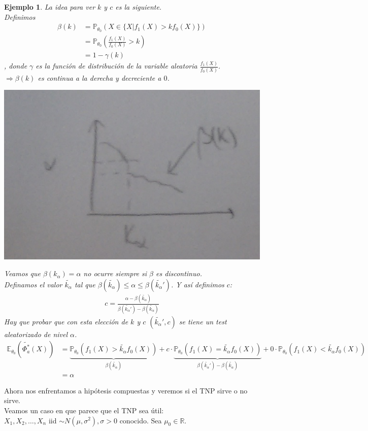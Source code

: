 \documentclass[10pt]{article}
\theoremstyle{plain}
\newtheorem{ej}{Ejemplo}
\theoremstyle{definition}
\begin{document}
\begin{ej}
La idea para ver $k$ y $c$ es la siguiente.\\
Definimos
\begin{align*}
\beta (k) &= \mathbb{P}_{\theta_{0}}\left(X \in \{X| f_{1}(X) > kf_{0}(X)\}\right)\\
&= \mathbb{P}_{\theta_{0}}\left(\frac{f_{1}(X)}{f_{0}(X)}>k\right) \\
&= 1- \gamma (k)
\end{align*}
, donde $\gamma$ es la función de distribución de la variable aleatoria $\frac{f_{1}(X)}{f_{0}(X)}$.\\
$\Rightarrow \beta (k)$ es continua a la derecha y decreciente a $0$.
\begin{center}
\includegraphics[scale=0.2]{imagenes/aleatorizado.png}
\end{center}
Veamos que $\beta (k_{\alpha}) = \alpha$ no ocurre siempre si $\beta$ es discontinuo.\\

Definamos el valor $\tilde{k_{\alpha}}$ tal que $\beta (\tilde{k_{\alpha}}) \le \alpha \le \beta (\tilde{k_{\alpha}}')$. Y así definimos $c$:
\begin{align*}
c = \frac{\alpha - \beta (\tilde{k_{\alpha}})}{\beta (\tilde{k_{\alpha}}') - \beta (\tilde{k_{\alpha}})}
\end{align*}
Hay que probar que con esta elección de $k$ y $c$ $(\tilde{k_{\alpha}}',c)$ se tiene un test aleatorizado de nivel $\alpha$.
\begin{align*}
\mathbb{E}_{\theta_{0}}(\tilde{\Phi_{a}^*}(X)) &= \underbrace{\mathbb{P}_{\theta_{0}}(f_{1}(X)>\tilde{k_{\alpha}}f_{0}(X))}_{\beta (\tilde{k_{\alpha}})}+ c\cdot\underbrace{\mathbb{P}_{\theta_{0}}(f_{1}(X)=\tilde{k_{\alpha}}f_{0}(X))}_{\beta (\tilde{k_{\alpha}}')-\beta (\tilde{k_{\alpha}})}+ 0\cdot\mathbb{P}_{\theta_{0}}(f_{1}(X)<\tilde{k_{\alpha}}f_{0}(X))\\
&= \alpha
\end{align*}
\end{ej}
Ahora nos enfrentamos a hipótesis compuestas y veremos si el TNP sirve o no sirve.\\
Veamos un caso en que parece que el TNP sea útil:\\
$X_{1},X_{2},\ldots, X_{n}$ iid $\sim N(\mu ,\sigma^2), \sigma>0$ conocido. Sea $\mu_{0} \in \mathbb{R}$.\\
\end{document}
